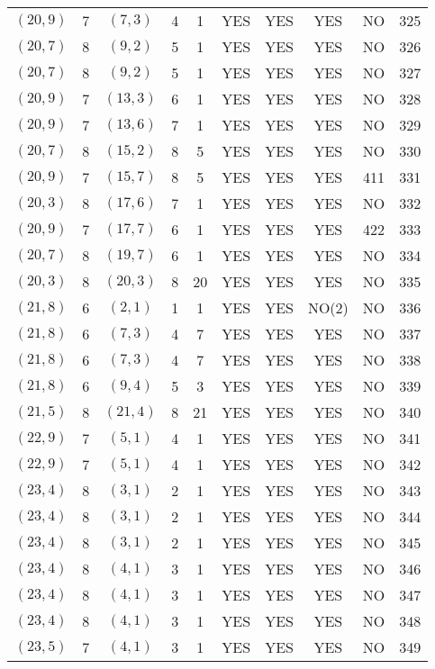 \begin{longtable}{|c|c|c|c|c|c|c|c|c|c|}
$(20, 9)$ & 7 & $(7, 3)$ & 4 & 1 & YES & YES & YES & NO & 325\\
$(20, 7)$ & 8 & $(9, 2)$ & 5 & 1 & YES & YES & YES & NO & 326\\
$(20, 7)$ & 8 & $(9, 2)$ & 5 & 1 & YES & YES & YES & NO & 327\\
$(20, 9)$ & 7 & $(13, 3)$ & 6 & 1 & YES & YES & YES & NO & 328\\
$(20, 9)$ & 7 & $(13, 6)$ & 7 & 1 & YES & YES & YES & NO & 329\\
$(20, 7)$ & 8 & $(15, 2)$ & 8 & 5 & YES & YES & YES & NO & 330\\
$(20, 9)$ & 7 & $(15, 7)$ & 8 & 5 & YES & YES & YES & 411 & 331\\
$(20, 3)$ & 8 & $(17, 6)$ & 7 & 1 & YES & YES & YES & NO & 332\\
$(20, 9)$ & 7 & $(17, 7)$ & 6 & 1 & YES & YES & YES & 422 & 333\\
$(20, 7)$ & 8 & $(19, 7)$ & 6 & 1 & YES & YES & YES & NO & 334\\
$(20, 3)$ & 8 & $(20, 3)$ & 8 & 20 & YES & YES & YES & NO & 335\\
$(21, 8)$ & 6 & $(2, 1)$ & 1 & 1 & YES & YES & NO(2) & NO & 336\\
$(21, 8)$ & 6 & $(7, 3)$ & 4 & 7 & YES & YES & YES & NO & 337\\
$(21, 8)$ & 6 & $(7, 3)$ & 4 & 7 & YES & YES & YES & NO & 338\\
$(21, 8)$ & 6 & $(9, 4)$ & 5 & 3 & YES & YES & YES & NO & 339\\
$(21, 5)$ & 8 & $(21, 4)$ & 8 & 21 & YES & YES & YES & NO & 340\\
$(22, 9)$ & 7 & $(5, 1)$ & 4 & 1 & YES & YES & YES & NO & 341\\
$(22, 9)$ & 7 & $(5, 1)$ & 4 & 1 & YES & YES & YES & NO & 342\\
$(23, 4)$ & 8 & $(3, 1)$ & 2 & 1 & YES & YES & YES & NO & 343\\
$(23, 4)$ & 8 & $(3, 1)$ & 2 & 1 & YES & YES & YES & NO & 344\\
$(23, 4)$ & 8 & $(3, 1)$ & 2 & 1 & YES & YES & YES & NO & 345\\
$(23, 4)$ & 8 & $(4, 1)$ & 3 & 1 & YES & YES & YES & NO & 346\\
$(23, 4)$ & 8 & $(4, 1)$ & 3 & 1 & YES & YES & YES & NO & 347\\
$(23, 4)$ & 8 & $(4, 1)$ & 3 & 1 & YES & YES & YES & NO & 348\\
$(23, 5)$ & 7 & $(4, 1)$ & 3 & 1 & YES & YES & YES & NO & 349\\

\end{longtable}
